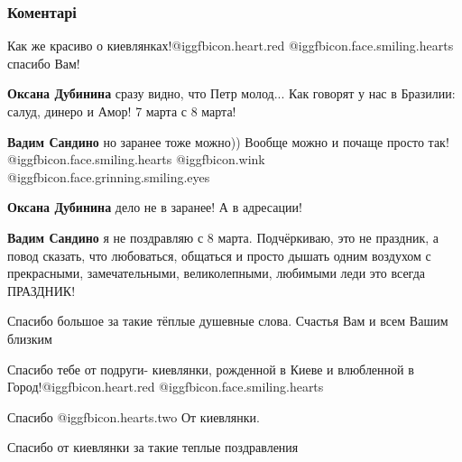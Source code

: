  
 
 
 
 
\subsubsection{Коментарі}
\label{sec:07_03_2021.fb.fb_group.story_kiev_ua.1.kievljanki.cmt}

\begin{itemize} %
Как же красиво о киевлянках!@igg{fbicon.heart.red}  @igg{fbicon.face.smiling.hearts} 
спасибо Вам!

\begin{itemize} %
\textbf{Оксана Дубинина} сразу видно, что Петр молод... Как говорят у нас в Бразилии: салуд, динеро и Амор! 7 марта с 8 марта!

\textbf{Вадим Сандино} но заранее тоже можно))
Вообще можно и почаще просто так! @igg{fbicon.face.smiling.hearts}  @igg{fbicon.wink}  @igg{fbicon.face.grinning.smiling.eyes} 

\textbf{Оксана Дубинина} дело не в заранее! А в адресации!

\textbf{Вадим Сандино} я не поздравляю с 8 марта. Подчёркиваю, это не праздник, а повод сказать, что любоваться, общаться и просто дышать одним воздухом с прекрасными, замечательными, великолепными, любимыми леди это всегда ПРАЗДНИК!
\end{itemize} %

Спасибо большое за такие тёплые душевные слова. Счастья Вам и всем Вашим близким


Спасибо тебе от подруги- киевлянки, рожденной в Киеве и влюбленной в Город!@igg{fbicon.heart.red} @igg{fbicon.face.smiling.hearts} 


Спасибо @igg{fbicon.hearts.two} 
От киевлянки.

Спасибо от
киевлянки за такие теплые поздравления



\end{itemize}
